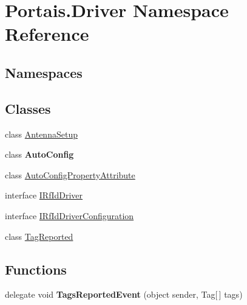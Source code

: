 \hypertarget{namespace_portais_1_1_driver}{}\section{Portais.\+Driver Namespace Reference}
\label{namespace_portais_1_1_driver}
\subsection*{Namespaces}
\begin{DoxyCompactItemize}
\end{DoxyCompactItemize}
\subsection*{Classes}
\begin{DoxyCompactItemize}
\item 
class \hyperlink{class_portais_1_1_driver_1_1_antenna_setup}{Antenna\+Setup}
\item 
class {\bfseries Auto\+Config}
\item 
class \hyperlink{class_portais_1_1_driver_1_1_auto_config_property_attribute}{Auto\+Config\+Property\+Attribute}
\item 
interface \hyperlink{interface_portais_1_1_driver_1_1_i_rf_id_driver}{I\+Rf\+Id\+Driver}
\item 
interface \hyperlink{interface_portais_1_1_driver_1_1_i_rf_id_driver_configuration}{I\+Rf\+Id\+Driver\+Configuration}
\item 
class \hyperlink{class_portais_1_1_driver_1_1_tag_reported}{Tag\+Reported}
\end{DoxyCompactItemize}
\subsection*{Functions}
\begin{DoxyCompactItemize}
\item 
delegate void {\bfseries Tags\+Reported\+Event} (object sender, Tag\mbox{[}$\,$\mbox{]} tags)\hypertarget{namespace_portais_1_1_driver_a5dbc7179cac4f01dc29bd542c7421d24}{}\label{namespace_portais_1_1_driver_a5dbc7179cac4f01dc29bd542c7421d24}

\end{DoxyCompactItemize}
